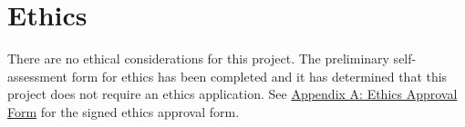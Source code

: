 \chapter{Ethics}
\label{chapter:ethics}

There are no ethical considerations for this project. The preliminary self-assessment form for ethics has been completed and it has determined that this project does not require an ethics application. See \hyperlink{appendix:ethics}{Appendix A: Ethics Approval Form} for the signed ethics approval form.
